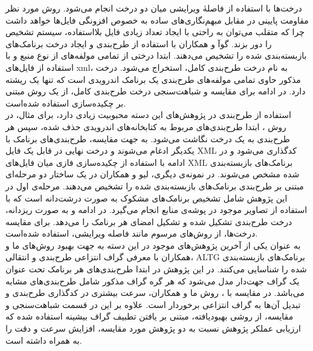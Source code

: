 درخت‌ها با استفاده از فاصلهٰ ویرایشی میان دو درخت انجام می‌شود. روش مورد نظر مقاومت پایینی در مقابل مبهم‌نگاری‌های ساده به خصوص افزونگی فایل‌ها خواهد داشت چرا که متقلب می‌توان به راحتی با ایجاد تعداد زیادی فایل بلااستفاده، سیستم تشخیص را دور بزند.
گوآ و همکاران با استفاده از طرح‌بندی و ایجاد درخت برنامک‌های بازبسته‌بندی شده را تشخیص می‌دهند. ابتدا درختی از تمامی مولفه‌های از نوع منبع و با استفاده از فایل‌های xml، به نام درخت طرح‌بندی کامل، استخراج می‌شود. درخت مذکور حاوی تمامی مولفه‌های طرح‌بندی یک برنامک اندرویدی است که تنها یک ریشته دارد. در ادامه برای مقایسه‌ و شباهت‌سنجی درخت طرح‌بندی کامل، از یک روش مبتنی بر چکیده‌سازی  استفاده شده‌است. \\ استفاده از طرح‌بندی در پژوهش‌های این دسته محبوبیت زیادی دارد، برای مثال، در روش ، ابتدا طرح‌بندی‌های مربوط به کتابخانه‌های اندرویدی حذف شده، سپس هر طرح‌بندی به یک درخت نگاشت می‌شود. به جهت مقایسه، طرح‌بندی‌های برنامک با یکدیگر ادغام می‌شوند و درخت نهایی در قابل یک فایل XML کدگذاری می‌شود و در ادامه با استفاده از چکیده‌سازی فازی میان فایل‌های XML برنامک‌های بازبسته‌بندی شده مشخص می‌شوند. در نمونه‌ی دیگری، لیو و همکاران در یک ساختار دو مرحله‌ای مبتنی بر طرح‌بندی برنامک‌های بازبسته‌بندی شده را تشخیص می‌دهند. مرحله‌ی اول در این پژوهش شامل تشخیص برنامک‌های مشکوک به صورت درشت‌دانه است که با استفاده از تصاویر موجود در پوشه‌ی منابع انجام می‌گیرد. در ادامه و به صورت ریز‌دانه، درخت طرح‌بندی تشکیل شده و تشکیل امضا‌ی هر برنامک را می‌دهد. برای مقایسه درخت‌ها، از روش‌های مرسوم مانند فاصله ویرایشی، استفاده شده‌است.\\
به عنوان یکی از آخرین پژوهش‌های موجود در این دسته به جهت بهبود روش‌های ما و همکاران  با معرفی گراف انتزاعی طرح‌بندی و انتقالی، ALTG برنامک‌های بازبسته‌بندی شده را شناسایی می‌کنند. در این پژوهش در ابتدا طرح‌بندی‌های هر برنامک تحت عنوان یک گراف جهت‌دار مدل می‌شود که هر گره‌ گراف مذکور شامل طرح‌بندی‌های مشابه می‌باشد. در مقایسه با ، روش ما و همکاران، سرعت بیشتری در کدگذاری طرح‌بندی و تبدیل آن‌ها به گراف انتزاعی برخوردار است. علاوه بر این در قسمت شباهت‌سنجی و مقایسه، از روشی بهبود‌یافته، مبتنی بر یافتن تطبیف گراف بیشینه استفاده شده که ارزیابی عملکر پژوهش نسبت به دو پژوهش مورد مقایسه، افزایش سرعت و دقت را به همراه داشته است.




